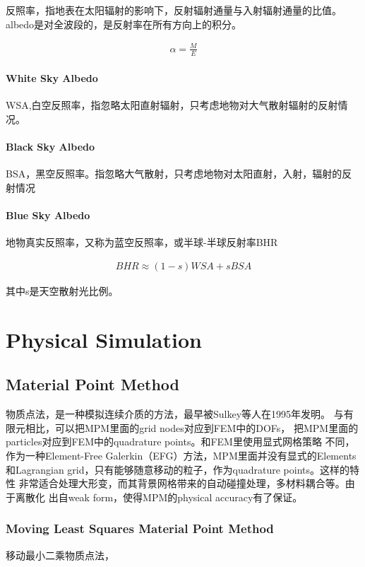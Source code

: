 反照率，指地表在太阳辐射的影响下，反射辐射通量与入射辐射通量的比值。albedo是对全波段的，是反射率在所有方向上的积分。

\begin{align*}
    \alpha = \frac{M}{E}
\end{align*}

\subsubsection{White Sky Albedo}

WSA,白空反照率，指忽略太阳直射辐射，只考虑地物对大气散射辐射的反射情况。

\subsubsection{Black Sky Albedo}

BSA，黑空反照率。指忽略大气散射，只考虑地物对太阳直射，入射，辐射的反射情况

\subsubsection{Blue Sky Albedo}

地物真实反照率，又称为蓝空反照率，或半球-半球反射率BHR

\begin{align*}
    BHR \approx (1-s)WSA + sBSA 
\end{align*}

其中s是天空散射光比例。


\chapter{Physical Simulation}

\section{Material Point Method}

物质点法，是一种模拟连续介质的方法，最早被Sulkey等人在1995年发明。
与有限元相比，可以把MPM里面的grid nodes对应到FEM中的DOFs，
把MPM里面的particles对应到FEM中的quadrature points。和FEM里使用显式网格策略
不同，作为一种Element-Free Galerkin（EFG）方法，MPM里面并没有显式的Elements
和Lagrangian grid，只有能够随意移动的粒子，作为quadrature points。这样的特性
非常适合处理大形变，而其背景网格带来的自动碰撞处理，多材料耦合等。由于离散化
出自weak form，使得MPM的physical accuracy有了保证。

\subsection{Moving Least Squares Material Point Method}

移动最小二乘物质点法，

